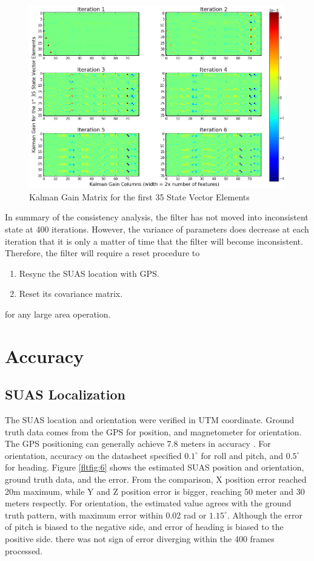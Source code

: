 \begin{figure}[h]
\centering
\includegraphics[width=14cm, keepaspectratio=true]
{./Figures/fltfig/cut1/Figure113.png}
\caption{Kalman Gain Matrix for the first 35 State Vector Elements}
\label{fltfig:5}
\end{figure}

In summary of the consistency analysis, the filter has not moved into
inconsistent state at 400 iterations. However, the variance of
parameters does decrease at each iteration that it is only a matter of
time that the filter will become inconsistent. Therefore, the filter
will require a reset procedure to 

\begin{enumerate}
  \item Resync the SUAS location with GPS. 
  \item Reset its covariance matrix. 
\end{enumerate}

\noindent for any large area operation. 
\FloatBarrier
\section{Accuracy}
\subsection{SUAS Localization}

The SUAS location and orientation were verified in UTM coordinate.
Ground truth data comes from the GPS for position, and magnetometer
for orientation. The GPS positioning can generally achieve 7.8 meters
in accuracy \cite{_gps_????}. For orientation, accuracy on the
datasheet specified $0.1^{\circ}$ for roll and pitch, and
$0.5^{\circ}$ for heading. Figure \ref{fltfig:6} shows the estimated
SUAS position and orientation, ground truth data, and the error. From
the comparison, X position error reached 20m maximum, while Y and Z
position error is bigger, reaching 50 meter and 30 meters respectly.
For orientation, the estimated value agrees with the ground truth
pattern, with maximum error within 0.02 rad or $1.15^{\circ}$.
Although the error of pitch is biased to the negative side, and error
of heading is biased to the positive side. there was not sign of error
diverging within the 400 frames processed.


